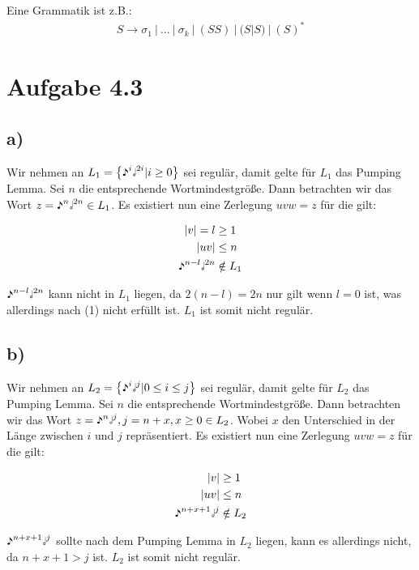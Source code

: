 \documentclass{article}
\begin{document}
Eine Grammatik ist z.B.:
\begin{align*}
S \rightarrow \sigma_1\ |\ ...\ |\ \sigma_k\ |\ (SS)\ |\ (S|S)\ |\ (S)^* 
\end{align*}



\section*{Aufgabe 4.3}
\subsection*{a)}
Wir nehmen an $L_1=\left\{\eighthnote^i\halfnote^{2i} | i \geq 0\right\}$ sei regulär, damit gelte für $L_1$ das Pumping Lemma. Sei $n$ die entsprechende Wortmindestgröße. Dann betrachten wir das Wort $z=\eighthnote^n\halfnote^{2n} \in L_1$. Es existiert nun eine Zerlegung $uvw=z$ für die gilt:

\begin{align}
|v| = l &\geq 1\\
|uv| &\leq n\\
\eighthnote^{n-l}\halfnote^{2n} &\notin L_1
\end{align}

$\eighthnote^{n-l}\halfnote^{2n}$ kann nicht in $L_1$ liegen, da $2(n-l) = 2n$ nur gilt wenn $l=0$ ist, was allerdings nach (1) nicht erfüllt ist. $L_1$ ist somit nicht regulär.
\setcounter{equation}{0}


\subsection*{b)}
Wir nehmen an $L_2=\left\{\eighthnote^i\halfnote^j | 0\leq i \leq j\right\}$ sei regulär, damit gelte für $L_2$ das Pumping Lemma. Sei $n$ die entsprechende Wortmindestgröße. Dann betrachten wir das Wort $z=\eighthnote^n\halfnote^j, j = n + x, x \geq 0 \in L_2$. Wobei $x$ den Unterschied in der Länge zwischen $i$ und $j$ repräsentiert. Es existiert nun eine Zerlegung $uvw=z$ für die gilt:

\begin{align}
|v| &\geq 1\\
|uv| &\leq n\\
\eighthnote^{n+x+1}\halfnote^{j} &\notin L_2
\end{align}

$\eighthnote^{n+x+1}\halfnote^{j}$ sollte nach dem Pumping Lemma in $L_2$ liegen, kann es allerdings nicht, da $n+x+1 > j $ ist. $L_2$ ist somit nicht regulär.
\setcounter{equation}{0}
\end{document}
